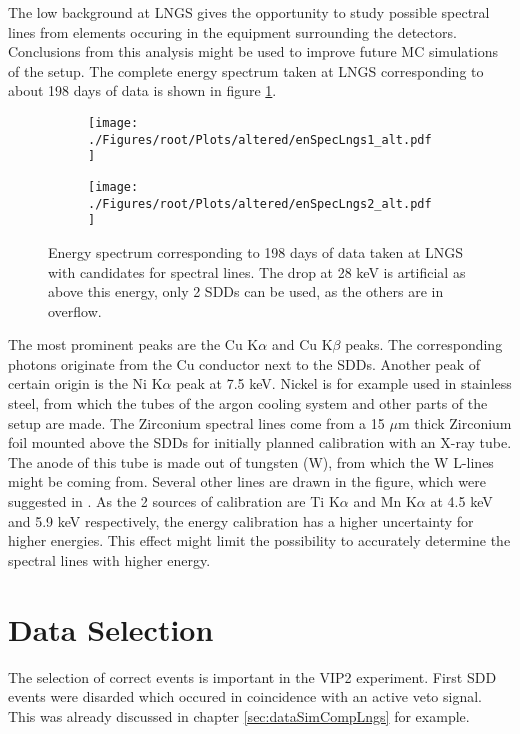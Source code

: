The low background at LNGS gives the opportunity to study possible spectral lines from elements occuring in the equipment surrounding the detectors. Conclusions from this analysis might be used to improve future MC simulations of the setup. The complete energy spectrum taken at LNGS corresponding to about 198 days of data is shown in figure \ref{fig:spectralAna}.
\begin{figure}[h]
 \centering
 \begin{subfigure}{.49\textwidth}
 \centering
 \texttt{[image: ./Figures/root/Plots/altered/enSpecLngs1\_alt.pdf]}
 \end{subfigure}
 \hfill
 \begin{subfigure}{.46\textwidth}
 \centering
 \texttt{[image: ./Figures/root/Plots/altered/enSpecLngs2\_alt.pdf]}
 \end{subfigure}
 \caption{Energy spectrum corresponding to 198 days of data taken at LNGS with candidates for spectral lines. The drop at 28 keV is artificial as above this energy, only 2 SDDs can be used, as the others are in overflow.}
 \label{fig:spectralAna}
\end{figure}
The most prominent peaks are the Cu K$\alpha$ and Cu K$\beta$ peaks. The corresponding photons originate from the Cu conductor next to the SDDs. Another peak of certain origin is the Ni K$\alpha$ peak at 7.5 keV. Nickel is for example used in stainless steel, from which the tubes of the argon cooling system and other parts of the setup are made. The Zirconium spectral lines come from a 15 $\mu$m thick Zirconium foil mounted above the SDDs for initially planned calibration with an X-ray tube. The anode of this tube is made out of tungsten (W), from which the W L-lines might be coming from. Several other lines are drawn in the figure, which were suggested in \cite{Sperandio2008}. As the 2 sources of calibration are Ti K$\alpha$ and Mn K$\alpha$ at 4.5 keV and 5.9 keV respectively, the energy calibration has a higher uncertainty for higher energies. This effect might limit the possibility to accurately determine the spectral lines with higher energy.

\section{Data Selection}

The selection of correct events is important in the VIP2 experiment. First SDD events were disarded which occured in coincidence with an active veto signal. This was already discussed in chapter \ref{sec:dataSimCompLngs} for example. 

